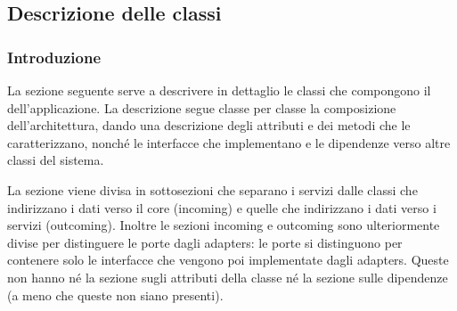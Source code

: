 \subsection{Descrizione delle classi}

\subsubsection{Introduzione}
\par La sezione seguente serve a descrivere in dettaglio le classi che compongono il  dell'applicazione. La descrizione segue classe per classe la composizione dell'architettura, dando una descrizione degli attributi e dei metodi che le caratterizzano, nonché le interfacce che implementano e le dipendenze verso altre classi del sistema.
\par La sezione viene divisa in sottosezioni che separano i servizi dalle classi che indirizzano i dati verso il core (incoming) e quelle che indirizzano i dati verso i servizi (outcoming). Inoltre le sezioni incoming e outcoming sono ulteriormente divise per distinguere le porte dagli adapters: le porte si distinguono per contenere solo le interfacce che vengono poi implementate dagli adapters. Queste non hanno né la sezione sugli attributi della classe né la sezione sulle dipendenze (a meno che queste non siano presenti). 


